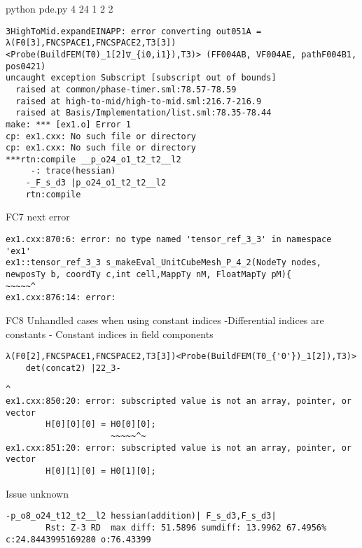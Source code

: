 \begin{description}
 python pde.py 4 24 1 2 2
\begin{lstlisting}[mathescape=true]
3HighToMid.expandEINAPP: error converting out051A = λ(F0[3],FNCSPACE1,FNCSPACE2,T3[3])<Probe(BuildFEM(T0)_1[2]∇_{i0,i1}),T3)> (FF004AB, VF004AE, pathF004B1, pos0421)
uncaught exception Subscript [subscript out of bounds]
  raised at common/phase-timer.sml:78.57-78.59
  raised at high-to-mid/high-to-mid.sml:216.7-216.9
  raised at Basis/Implementation/list.sml:78.35-78.44
make: *** [ex1.o] Error 1
cp: ex1.cxx: No such file or directory
cp: ex1.cxx: No such file or directory
***rtn:compile __p_o24_o1_t2_t2__l2
	 -: trace(hessian)
	-_F_s_d3 |p_o24_o1_t2_t2__l2
	rtn:compile 
	  \end{lstlisting}
\item{FC7}  
	  next error
\begin{lstlisting}[mathescape=true]
	  ex1.cxx:870:6: error: no type named 'tensor_ref_3_3' in namespace 'ex1'
ex1::tensor_ref_3_3 s_makeEval_UnitCubeMesh_P_4_2(NodeTy nodes, newposTy b, coordTy c,int cell,MappTy nM, FloatMapTy pM){
~~~~~^
ex1.cxx:876:14: error:
\end{lstlisting}
\item{FC8}
Unhandled cases when using constant indices
-Differential indices are constants
- Constant indices in field components
\begin{lstlisting}[mathescape=true]
	λ(F0[2],FNCSPACE1,FNCSPACE2,T3[3])<Probe(BuildFEM(T0_{'0'})_1[2]),T3)>
	det(concat2) |22_3- 
	\end{lstlisting}
	
	\item[FC9]
	\begin{lstlisting}[mathescape=true]
                ^
ex1.cxx:850:20: error: subscripted value is not an array, pointer, or vector
        H[0][0][0] = H0[0][0];
                     ~~~~~^~
ex1.cxx:851:20: error: subscripted value is not an array, pointer, or vector
        H[0][1][0] = H0[1][0];
        	\end{lstlisting}
	\item[FT10] 
	Issue unknown       	
   	\begin{lstlisting}[mathescape=true]     	-p_o8_o24_t12_t2__l2 hessian(addition)| F_s_d3,F_s_d3| 
		Rst: Z-3 RD  max diff: 51.5896 sumdiff: 13.9962 67.4956% c:24.8443995169280 o:76.43399
    	\end{lstlisting}

\end{description}
